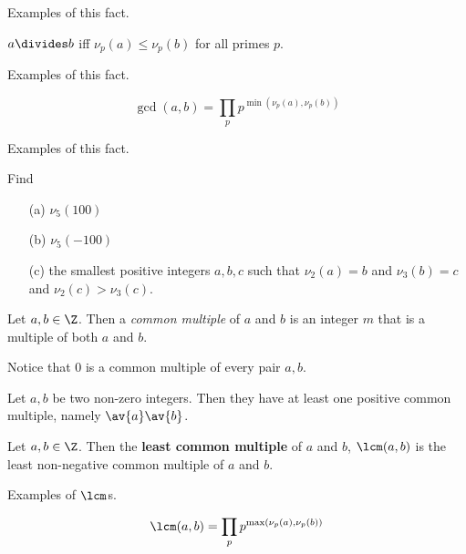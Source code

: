 \documentclass[oneside,12pt]{amsart}
\begin{document}
\begin{in_class_example}
Examples of this fact.
\end{in_class_example}

\begin{numbered_fact}
$a\divides b$ iff $\nu_p(a) \leq \nu_p(b)$ for all primes $p$.
\end{numbered_fact}

\begin{in_class_example}
Examples of this fact.
\end{in_class_example}

\begin{numbered_fact}
$$\gcd(a,b)=\prod_p p^{\min(\nu_p(a), \nu_p(b))}$$
\end{numbered_fact}

\begin{in_class_example}
Examples of this fact.
\end{in_class_example}

\begin{homework} Find
\begin{enumerate}
\item[(a)] $\nu_5(100)$
\item[(b)] $\nu_5(-100)$
\item[(c)] the smallest positive integers $a,b,c$ such that $\nu_2(a)=b$ and 
$\nu_3(b)=c$ and $\nu_2(c) > \nu_3(c)$.
\end{enumerate}
\end{homework}

\begin{definition}
Let $a,b\in\Z$. Then a \emph{common multiple} of $a$ and $b$ is an integer $m$
that is a multiple of both $a$ and $b$. 
\end{definition}

Notice that 0 is a common multiple of every pair $a,b$.

Let $a,b$ be two non-zero integers. Then they have at least one positive common multiple,
namely $\av{a} \av{b}$.

\begin{definition}
Let $a,b\in \Z$. Then the \textbf{least common multiple} of $a$ and $b$,
$\lcm(a,b)$ is the least non-negative common multiple of $a$ and $b$.
\end{definition}

\begin{in_class_example}
Examples of $\lcm$s.
\end{in_class_example}

\begin{numbered_fact}
$$\lcm(a,b) =\prod_p p^{\max(\nu_p(a), \nu_p(b))}$$
\end{numbered_fact}
\end{document}
